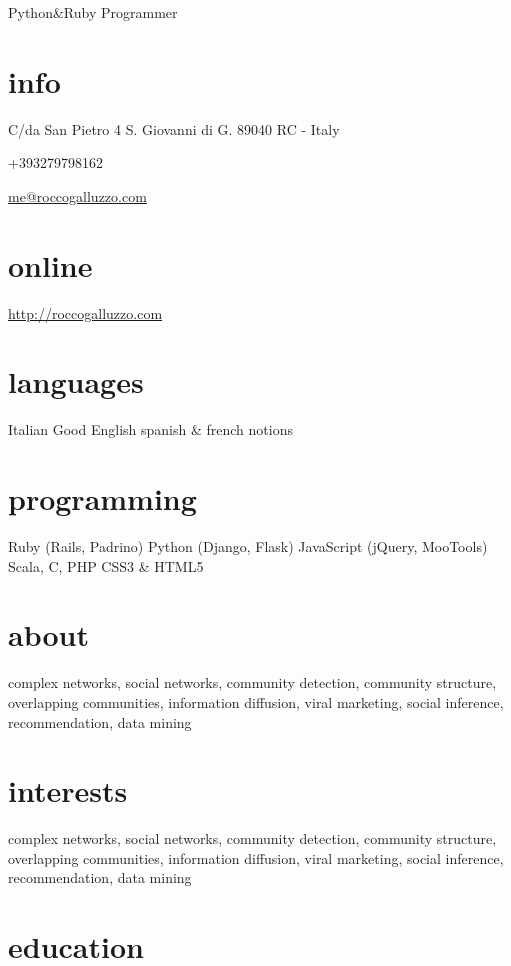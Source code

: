 \documentclass[]{cv}
\begin{document}
       {Python\&Ruby Programmer}

\begin{aside}
\section{info}
    C/da San Pietro 4
    S. Giovanni di G.
    89040 RC - Italy\par\smallskip
   +393279798162\par\smallskip
	\href{mailto:me@roccogalluzzo.com}{me@roccogalluzzo.com}
	\section{online}
	\href{http://roccogalluzzo.com}{http://roccogalluzzo.com}
	
  \section{languages}
    Italian
    Good English 
    spanish \& french notions
  \section{programming}
    Ruby
    (Rails, Padrino)
    Python
    (Django, Flask)
    JavaScript
    (jQuery, MooTools)
    Scala, C, PHP
    CSS3 \& HTML5
\end{aside}

\section{about}

complex networks, social networks, community detection, community structure,
overlapping communities, information diffusion, viral marketing, social
inference, recommendation, data mining

\section{interests}

complex networks, social networks, community detection, community structure,
overlapping communities, information diffusion, viral marketing, social
inference, recommendation, data mining

\section{education}
\end{document}
